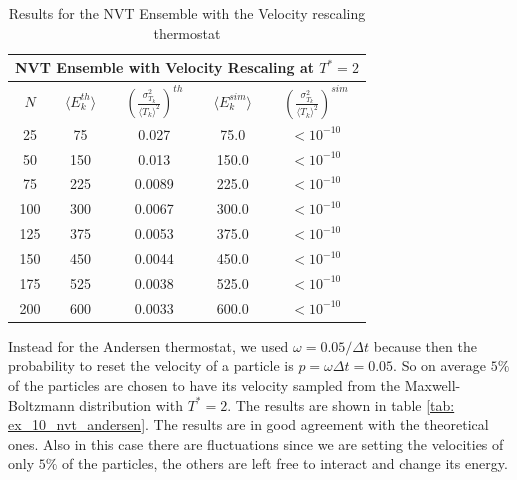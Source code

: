 \documentclass[../main.tex]{subfiles}
\begin{document}
\begin{table}[h!]
    \centering
    \begin{tabular}{ccccc}
        \toprule
        \multicolumn{5}{c}{\textbf{NVT Ensemble with Velocity Rescaling at $T^*=2$}}\\
        \midrule
        $N$     & $\langle E_k^{th}\rangle$ & $\left(\frac{\sigma^2_{T_k}}{\langle T_k\rangle^2}\right)^{th}$ & $\langle E_k^{sim}\rangle$ & $\left(\frac{\sigma^2_{T_k}}{\langle T_k\rangle^2}\right)^{sim}$\\
        \hline
        25      & 75  & 0.027  & 75.0  & $< 10^{-10}$  \\
        50      & 150 & 0.013  & 150.0 & $< 10^{-10}$ \\
        75      & 225 & 0.0089 & 225.0 & $< 10^{-10}$ \\
        100     & 300 & 0.0067 & 300.0 & $< 10^{-10}$ \\
        125     & 375 & 0.0053 & 375.0 & $< 10^{-10}$ \\
        150     & 450 & 0.0044 & 450.0 & $< 10^{-10}$ \\
        175     & 525 & 0.0038 & 525.0 & $< 10^{-10}$ \\
        200     & 600 & 0.0033 & 600.0 & $< 10^{-10}$ \\
        \hline
    \end{tabular}
    \caption{Results for the NVT Ensemble with the Velocity rescaling thermostat}
    \label{tab: ex_10_nvt_vresc}
\end{table}

\noindent Instead for the Andersen thermostat, we used $\omega=0.05/\Delta t$ because then the probability to reset the velocity of a particle is $p=\omega \Delta t = 0.05$. So on average $5\%$ of the particles are chosen to have its velocity sampled from the Maxwell-Boltzmann distribution with $T^* = 2$. The results are shown in table \ref{tab: ex_10_nvt_andersen}. The results are in good agreement with the theoretical ones. Also in this case there are fluctuations since we are setting the velocities of only $5\%$ of the particles, the others are left free to interact and change its energy.
\end{document}
